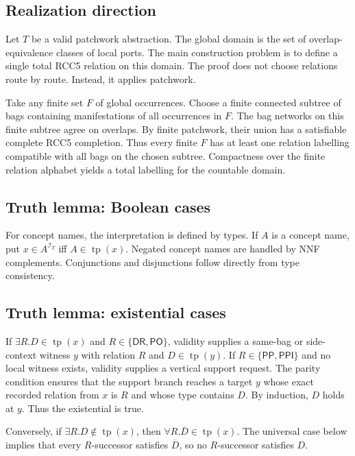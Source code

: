 \documentclass[11pt]{article}
\newcommand{\PP}{\mathsf{PP}}
\newcommand{\PPI}{\mathsf{PPI}}
\newcommand{\PO}{\mathsf{PO}}
\newcommand{\DR}{\mathsf{DR}}
\newcommand{\tp}{\operatorname{tp}}
\newcommand{\calI}{\mathcal I}
\begin{document}
\subsection{Realization direction}

Let $T$ be a valid patchwork abstraction.  The global domain is the set of overlap-equivalence classes of local ports.  The main construction problem is to define a single total RCC5 relation on this domain.  The proof does not choose relations route by route.  Instead, it applies patchwork.

Take any finite set $F$ of global occurrences.  Choose a finite connected subtree of bags containing manifestations of all occurrences in $F$.  The bag networks on this finite subtree agree on overlaps.  By finite patchwork, their union has a satisfiable complete RCC5 completion.  Thus every finite $F$ has at least one relation labelling compatible with all bags on the chosen subtree.  Compactness over the finite relation alphabet yields a total labelling for the countable domain.

\subsection{Truth lemma: Boolean cases}

For concept names, the interpretation is defined by types.  If $A$ is a concept name, put $x\in A^{\calI_T}$ iff $A\in\tp(x)$.  Negated concept names are handled by NNF complements.  Conjunctions and disjunctions follow directly from type consistency.

\subsection{Truth lemma: existential cases}

If $\exists R.D\in\tp(x)$ and $R\in\{\DR,\PO\}$, validity supplies a same-bag or side-context witness $y$ with relation $R$ and $D\in\tp(y)$.  If $R\in\{\PP,\PPI\}$ and no local witness exists, validity supplies a vertical support request.  The parity condition ensures that the support branch reaches a target $y$ whose exact recorded relation from $x$ is $R$ and whose type contains $D$.  By induction, $D$ holds at $y$.  Thus the existential is true.

Conversely, if $\exists R.D\notin\tp(x)$, then $\forall R.\overline D\in\tp(x)$.  The universal case below implies that every $R$-successor satisfies $\overline D$, so no $R$-successor satisfies $D$.
\end{document}
